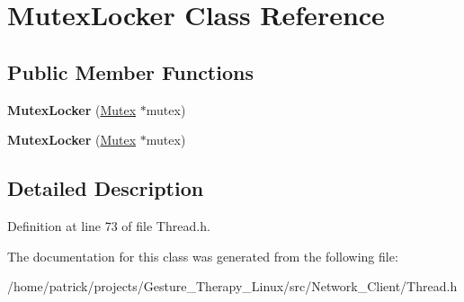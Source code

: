 \hypertarget{class_mutex_locker}{}\section{Mutex\+Locker Class Reference}
\label{class_mutex_locker}
\subsection*{Public Member Functions}
\begin{DoxyCompactItemize}
\item 
\mbox{\label{class_mutex_locker_acef96041569e591aacafe315575ed62e}} 
{\bfseries Mutex\+Locker} (\hyperlink{class_mutex}{Mutex} $\ast$mutex)
\item 
\mbox{\label{class_mutex_locker_acef96041569e591aacafe315575ed62e}} 
{\bfseries Mutex\+Locker} (\hyperlink{class_mutex}{Mutex} $\ast$mutex)
\end{DoxyCompactItemize}


\subsection{Detailed Description}


Definition at line 73 of file Thread.\+h.



The documentation for this class was generated from the following file\+:\begin{DoxyCompactItemize}
\item 
/home/patrick/projects/\+Gesture\+\_\+\+Therapy\+\_\+\+Linux/src/\+Network\+\_\+\+Client/Thread.\+h\end{DoxyCompactItemize}
